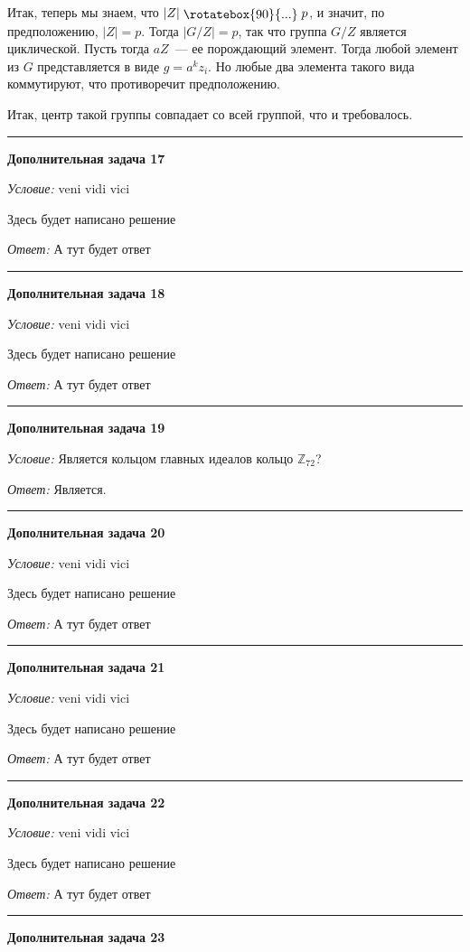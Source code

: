 \documentclass[12pt,a4paper]{article}
\newcommand{\divis}{\mathrel{\raisebox{-1pt}{\rotatebox{90}{...}}}}
\newcommand{\sbs}{\large \bfseries}
\newcommand{\rl}{\vspace{16pt} \hrule \vspace{8pt}}
\begin{document}
Итак, теперь мы знаем, что $|Z|\divis p$, и значит, по предположению, $|Z|=p$. Тогда $|G/Z|=p$, так что группа $G/Z$ является циклической. Пусть тогда $aZ$~--- ее порождающий элемент. Тогда любой элемент из $G$ представляется в виде $g = a^kz_i$. Но любые два элемента такого вида коммутируют, что противоречит предположению.

Итак, центр такой группы совпадает со всей группой, что и требовалось.




\rl
{\sbs Дополнительная задача 17}

{\itshape Условие: } veni vidi vici

Здесь будет написано решение

{\itshape Ответ: } А тут будет ответ




\rl
{\sbs Дополнительная задача 18}

{\itshape Условие: } veni vidi vici

Здесь будет написано решение

{\itshape Ответ: } А тут будет ответ




\rl
{\sbs Дополнительная задача 19}

{\itshape Условие: } Является кольцом главных идеалов кольцо $\mathds{Z}_{72}$?


{\itshape Ответ: } Является.




\rl
{\sbs Дополнительная задача 20}

{\itshape Условие: } veni vidi vici

Здесь будет написано решение

{\itshape Ответ: } А тут будет ответ




\rl
{\sbs Дополнительная задача 21}

{\itshape Условие: } veni vidi vici

Здесь будет написано решение

{\itshape Ответ: } А тут будет ответ




\rl
{\sbs Дополнительная задача 22}

{\itshape Условие: } veni vidi vici

Здесь будет написано решение

{\itshape Ответ: } А тут будет ответ




\rl
{\sbs Дополнительная задача 23}
\end{document}
